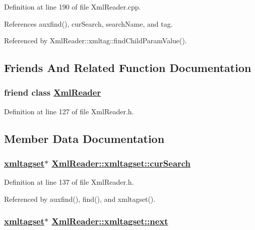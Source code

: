 Definition at line 190 of file Xml\-Reader.cpp.

References auxfind(), cur\-Search, search\-Name, and tag.

Referenced by Xml\-Reader::xmltag::find\-Child\-Param\-Value().

\subsection{Friends And Related Function Documentation}
\hypertarget{classXmlReader_1_1xmltagset_n0}{
\subsubsection[XmlReader]{\setlength{\rightskip}{0pt plus 5cm}friend class \hyperlink{classXmlReader}{Xml\-Reader}}}
\label{classXmlReader_1_1xmltagset_n0}




Definition at line 127 of file Xml\-Reader.h.

\subsection{Member Data Documentation}
\hypertarget{classXmlReader_1_1xmltagset_p0}{
\subsubsection[curSearch]{\setlength{\rightskip}{0pt plus 5cm}\hyperlink{classXmlReader_1_1xmltagset}{xmltagset}$\ast$ \hyperlink{classXmlReader_1_1xmltagset_p0}{Xml\-Reader::xmltagset::cur\-Search}}}
\label{classXmlReader_1_1xmltagset_p0}




Definition at line 137 of file Xml\-Reader.h.

Referenced by auxfind(), find(), and xmltagset().\hypertarget{classXmlReader_1_1xmltagset_o1}{
\subsubsection[next]{\setlength{\rightskip}{0pt plus 5cm}\hyperlink{classXmlReader_1_1xmltagset}{xmltagset}$\ast$ \hyperlink{classXmlReader_1_1xmltagset_o1}{Xml\-Reader::xmltagset::next}}}
\label{classXmlReader_1_1xmltagset_o1}




